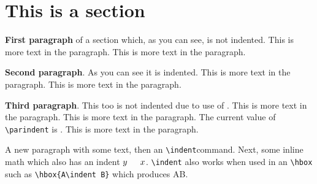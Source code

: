 \documentclass{article}
\begin{document}
	\setlength{\parindent}{20pt}
	
	\section*{This is a section}
	\textbf{First paragraph} of a section which, as you can see, is not indented. This is more text in the paragraph. This is more text in the paragraph.
	
	\textbf{Second paragraph}. As you can see it is indented. This is more text in the paragraph. This is more text in the paragraph. 
	
	\noindent\textbf{Third paragraph}. This too is not indented due to use of \texttt{\string\noindent}. This is more text in the paragraph. This is more text in the paragraph.  The current value of \verb|\parindent| is \the\parindent. This is more text in the paragraph.
	
	\noindent A new paragraph with some text, then an \verb|\indent|\indent command. Next, some inline math which also has an indent $y\indent x$. \verb|\indent| also works when used in an \verb|\hbox| such as \verb|\hbox{A\indent B}| which produces \hbox{A\indent B}.
	
\end{document}
